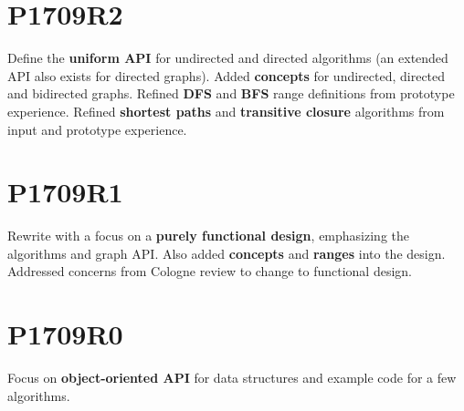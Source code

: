 \section*{P1709R2}
Define the \textbf{uniform API} for undirected and directed algorithms (an extended API also exists for directed graphs). Added \textbf{concepts} for undirected, directed and bidirected graphs. Refined \textbf{DFS} and \textbf{BFS} range definitions from prototype experience. Refined \textbf{shortest paths} and \textbf{transitive closure} algorithms from input and prototype experience.

\section*{P1709R1}
Rewrite with a focus on a \textbf{purely functional design}, emphasizing the algorithms and graph API. Also added \textbf{concepts} and \textbf{ranges} into the design. Addressed concerns from Cologne review to change to functional design.

\section*{P1709R0}
Focus on \textbf{object-oriented API} for data structures and example code for a few algorithms.
